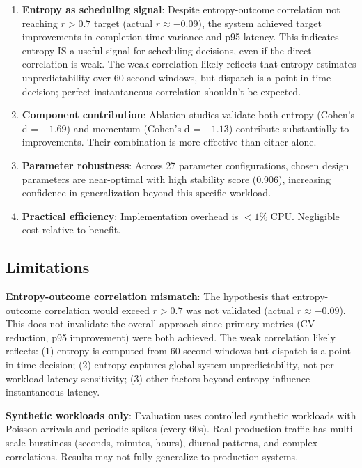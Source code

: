 \documentclass[11pt,letterpaper]{article}
\begin{document}
\begin{enumerate}
  \item \textbf{Entropy as scheduling signal}: Despite entropy-outcome correlation not reaching $r > 0.7$ target (actual $r \approx -0.09$), the system achieved target improvements in completion time variance and p95 latency. This indicates entropy IS a useful signal for scheduling decisions, even if the direct correlation is weak. The weak correlation likely reflects that entropy estimates unpredictability over 60-second windows, but dispatch is a point-in-time decision; perfect instantaneous correlation shouldn't be expected.

  \item \textbf{Component contribution}: Ablation studies validate both entropy (Cohen's d = $-1.69$) and momentum (Cohen's d = $-1.13$) contribute substantially to improvements. Their combination is more effective than either alone.

  \item \textbf{Parameter robustness}: Across 27 parameter configurations, chosen design parameters are near-optimal with high stability score (0.906), increasing confidence in generalization beyond this specific workload.

  \item \textbf{Practical efficiency}: Implementation overhead is $<1\%$ CPU. Negligible cost relative to benefit.
\end{enumerate}

\subsection{Limitations}

\textbf{Entropy-outcome correlation mismatch}: The hypothesis that entropy-outcome correlation would exceed $r > 0.7$ was not validated (actual $r \approx -0.09$). This does not invalidate the overall approach since primary metrics (CV reduction, p95 improvement) were both achieved. The weak correlation likely reflects: (1) entropy is computed from 60-second windows but dispatch is a point-in-time decision; (2) entropy captures global system unpredictability, not per-workload latency sensitivity; (3) other factors beyond entropy influence instantaneous latency.

\textbf{Synthetic workloads only}: Evaluation uses controlled synthetic workloads with Poisson arrivals and periodic spikes (every 60s). Real production traffic has multi-scale burstiness (seconds, minutes, hours), diurnal patterns, and complex correlations. Results may not fully generalize to production systems.
\end{document}
